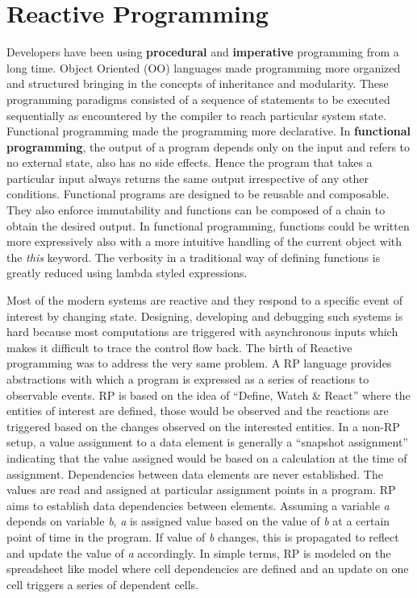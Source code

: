 \section {Reactive Programming}
Developers have been using \textbf{procedural} and \textbf{imperative} programming from a long time. 
Object Oriented (OO) languages made programming more organized and structured bringing in the concepts of inheritance and modularity. 
These programming paradigms consisted of a sequence of statements to be executed sequentially as encountered by the compiler to reach particular system state. 
Functional programming made the programming more declarative. 
In \textbf{functional programming}, the output of a program depends only on the input and refers to no external state, also has no side effects\cite{Gifford:1986:IFI:319838.319848}. 
Hence the program that takes a particular input always returns the same output irrespective of any other conditions.
Functional programs are designed to be reusable and composable. 
They also enforce immutability and functions can be composed of a chain to obtain the desired output. 
In functional programming, functions could be written more expressively also with a more intuitive handling of the current object with the \textit{this} keyword. 
The verbosity in a traditional way of defining functions is greatly reduced using lambda styled expressions.

Most of the modern systems are reactive and they respond to a specific event of interest by changing state. 
Designing, developing and debugging such systems is hard because most computations are triggered with asynchronous inputs which makes it difficult to trace the control flow back\cite{Margara:2014:WDD:2611286.2611290}. 
The birth of Reactive programming was to address the very same problem. A RP language provides abstractions with which a program is expressed as a series of reactions to observable events\cite{Bainomugisha:2013:SRP:2501654.2501666}. 
RP is based on the idea of ``Define, Watch \& React''\cite{RPvsFP} where the entities of interest are defined, those would be observed and the reactions are triggered based on the changes observed on the interested entities. 
In a non-RP setup, a value assignment to a data element is generally a ``snapshot assignment'' indicating that the value assigned would be based on a calculation at the time of assignment. 
Dependencies between data elements are never established. The values are read and assigned at particular assignment points in a program. 
RP aims to establish data dependencies between elements. 
Assuming a variable \textit{a} depends on variable \textit{b}, \textit{a} is assigned value based on the value of \textit{b} at a certain point of time in the program. 
If value of \textit{b} changes, this is propagated to reflect and update the value of \textit{a} accordingly. 
In simple terms, RP is modeled on the spreadsheet like model where cell dependencies are defined and an update on one cell triggers a series of dependent cells\cite{Bainomugisha:2013:SRP:2501654.2501666}.

